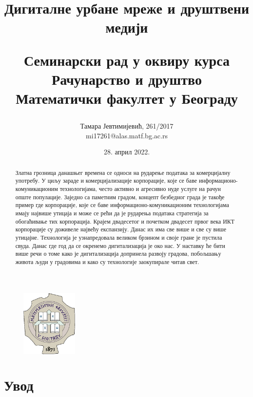 \documentclass{article}
\title{\textbf{Дигиталне урбане мреже и друштвени медији}

\vspace{10}
\small{Семинарски рад у оквиру курса \\Рачунарство и друштво \\
        Математички факултет у Београду}}
\author{Тамара Јевтимијевић, 261/2017\\mi17261@alas.matf.bg.ac.rs}
\date{28. април 2022.}
\begin{document}
\maketitle

\begin{figure}[h!]
\centering
\includegraphics[width=0.25\textwidth]{slike/grb.png}
\end{figure}

\vspace{30}
\begin{abstract}
Златна грозница данашњег времена се односи на
рударење података за комерцијалну употребу. У циљу зараде и комерцијализације
корпорације, које се баве информационо-комуникационим технологијама, често активно и агресивно нуде услуге на рачун опште популације. Заједно са паметним градом, концепт безбедног града је такође пример где корпорације, које се баве информационо-комуникационим технологијама имају највише утицаја и може се рећи да је рударења података стратегија за обогаћивање тих корпорација. Крајем двадесетог и почетком двадесет првог века ИКТ корпорације су доживеле највећу експанзију. Данас их има све више и све су више утицајне. Технологија је узнапредовала великом брзином и своје гране је пустила свуда. Данас где год да се окренемо дигитализација је око нас. У наставку ће бити више речи о томе како је дигитализација допринела развоју градова, побољшању живота људи у градовима и како су технологије заокупирале читав свет.
\end{abstract}

\newpage
\tableofcontents

\newpage
\section{Увод}
\end{document}
